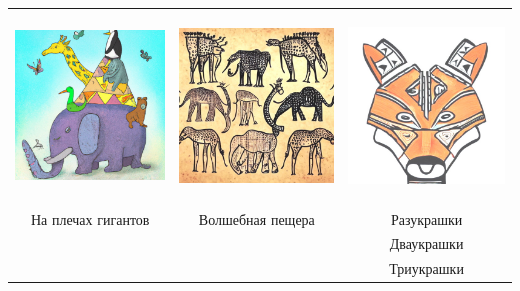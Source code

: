 \documentclass[14pt]{memoir}
\begin{document}
\begin{table}[h]
\begin{tabular}{ccc}
\includegraphics[height=5cm]{images/magic-pyramid} & \includegraphics[height=5cm]{images/cave-stories} & \includegraphics[height=5cm]{images/razukrashki.jpg}             \\
 На плечах гигантов       &  Волшебная пещера    &     Разукрашки \\    
        &      &     Дваукрашки \\
        &      &     Триукрашки \\
\end{tabular}
\end{table}
\end{document}
